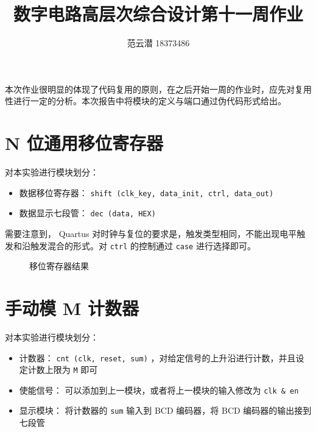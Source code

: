 \documentclass[lang=cn,11pt,a4paper,cite=authoryear]{elegantpaper}
\title{数字电路高层次综合设计\quad 第十一周作业}
\author{范云潜 18373486}
\institute{微电子学院 184111 班}
\date{\zhtoday}
\begin{document}
\maketitle


\tableofcontents

\listoffigures

本次作业很明显的体现了代码复用的原则，在之后开始一周的作业时，应先对复用性进行一定的分析。本次报告中将模块的定义与端口通过伪代码形式给出。

\section{N 位通用移位寄存器}

对本实验进行模块划分：

\begin{itemize}
    \item 数据移位寄存器： \lstinline{shift (clk_key, data_init, ctrl, data_out)} 
    \item 数据显示七段管： \lstinline{dec (data, HEX)}
\end{itemize}

需要注意到， Quartus 对时钟与复位的要求是，触发类型相同，不能出现电平触发和沿触发混合的形式。对 \lstinline{ctrl} 的控制通过 \lstinline{case} 进行选择即可。



\begin{figure}
    \centering
    \caption{移位寄存器结果}\label{01} 
     \hfill 
     \hfill
     \hfill 
     \bigskip 
\end{figure}

\section{手动模 M 计数器}

对本实验进行模块划分：

\begin{itemize}
    \item 计数器： \lstinline{cnt (clk, reset, sum)} ，对给定信号的上升沿进行计数，并且设定计数上限为 \lstinline{M} 即可
    \item 使能信号： 可以添加到上一模块，或者将上一模块的输入修改为 \lstinline{clk & en} 
    \item 显示模块： 将计数器的 \lstinline{sum} 输入到 BCD 编码器，将 BCD 编码器的输出接到七段管
\end{itemize}
\end{document}
